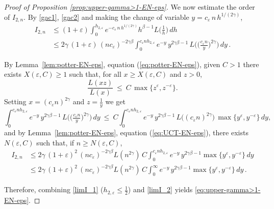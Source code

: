 \documentclass[10pt,a4paper]{amsart}
\begin{document}
\begin{proof}[Proof of Proposition \ref{prop:upper-gamma>1-EN-eps}]
We now estimate the order of \(I_{2,n}\). By \eqref{gac1}, \eqref{gac2} and making the change of variable \(y=c_{\varepsilon}\,n\,h^{1/(2\gamma)}\),
\begin{equation}
    \begin{split}
        I_{2,n} &\le (1+\varepsilon) \int_{0}^{h_{2,\varepsilon}} e^{-c_{\varepsilon}\,n \,h^{1/(2\gamma)}}h^{\beta-1}L\!\Big(\tfrac{1}{h}\Big)\,dh\\
        &\le 2\gamma\,(1+\varepsilon) \,(n c_{\varepsilon})^{-2\gamma\beta}\int_{0}^{c_{\varepsilon}n h_{2,\varepsilon}}e^{-y}\,y^{2\gamma\beta-1}\,
        L\!\Big(\big(\tfrac{c_{\varepsilon}n}{y}\big)^{2\gamma}\Big)\,dy\,.
    \end{split}
\end{equation}

By Lemma~\ref{lem:potter-EN-eps}, equation (\ref{eq:potter-EN-eps}), given \(C>1\) there exists \(X(\varepsilon,C)\ge 1\) such that, for all \(x\ge X(\varepsilon,C)\) and \(z>0\),
\[
\frac{L(xz)}{L(x)}\ \le\ C\,\max\{z^\varepsilon,z^{-\varepsilon}\}.
\]
Setting \(x=(c_{\varepsilon}n)^{2\gamma}\) and \(z=\tfrac{1}{y}\) we get
\[
\int_{0}^{c_{\varepsilon}n h_{2,\varepsilon}}e^{-y}\,y^{2\gamma\beta-1}\,
L\!\Big(\big(\tfrac{c_{\varepsilon}n}{y}\big)^{2\gamma}\Big)\,dy
\ \le\ 
C\int_{0}^{c_{\varepsilon}n h_{2,\varepsilon}}e^{-y}\,y^{2\gamma\beta-1}\,
L\big((c_{\varepsilon}n)^{2\gamma}\big)\,\max\{y^{\varepsilon},y^{-\varepsilon}\}\,dy,
\]
and by Lemma~\ref{lem:potter-EN-eps}, equation (\ref{eq:UCT-EN-eps}), there exists \(N(\varepsilon,C)\) such that, if \(n\ge N(\varepsilon,C)\),
\begin{equation}\label{limI_2}
\begin{split}
    I_{2,n}&\le 2\gamma\,(1+\varepsilon)^{2} \,(n c_{\varepsilon})^{-2\gamma\beta}L(n^{2\gamma})\,C
    \int_{0}^{c_{\varepsilon}n h_{2,\varepsilon}}e^{-y}\,y^{2\gamma\beta-1}\max\{y^{\varepsilon},y^{-\varepsilon}\}\,dy\\
    &\le 2\gamma\,(1+\varepsilon)^{2} \,(n c_{\varepsilon})^{-2\gamma\beta}L(n^{2\gamma})\,C
    \int_{0}^{\infty}e^{-y}\,y^{2\gamma\beta-1}\max\{y^{\varepsilon},y^{-\varepsilon}\}\,dy\,.
\end{split}
\end{equation}

Therefore, combining \eqref{limI_1} (\(h_{2,\varepsilon} \le \frac{1}{2}\)) and \eqref{limI_2} yields \eqref{eq:upper-gamma>1-EN-eps}.


\end{proof}
\end{document}

